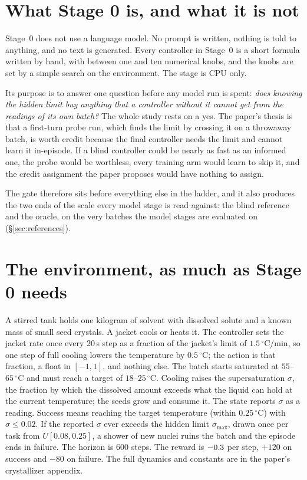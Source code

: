 \documentclass[11pt,a4paper]{article}
\newcommand{\smax}{\sigma_{\max}}
\begin{document}
\section{What Stage 0 is, and what it is not}

Stage~0 does not use a language model. No prompt is written, nothing is told
to anything, and no text is generated. Every controller in Stage~0 is a
short formula written by hand, with between one and ten numerical knobs, and
the knobs are set by a simple search on the environment. The stage is CPU
only.

Its purpose is to answer one question before any model run is spent:
\emph{does knowing the hidden limit buy anything that a controller without it
cannot get from the readings of its own batch?} The whole study rests on a
yes. The paper's thesis is that a first-turn probe run, which finds the limit
by crossing it on a throwaway batch, is worth credit because the final
controller needs the limit and cannot learn it in-episode. If a blind
controller could be nearly as fast as an informed one, the probe would be
worthless, every training arm would learn to skip it, and the credit
assignment the paper proposes would have nothing to assign.

The gate therefore sits before everything else in the ladder, and it also
produces the two ends of the scale every model stage is read against: the
blind reference and the oracle, on the very batches the model stages are
evaluated on (\S\ref{sec:references}).

\section{The environment, as much as Stage 0 needs}

A stirred tank holds one kilogram of solvent with dissolved solute and a
known mass of small seed crystals. A jacket cools or heats it. The
controller sets the jacket rate once every 20\,s step as a fraction of the
jacket's limit of $1.5\,^\circ$C/min, so one step of full cooling lowers the
temperature by $0.5\,^\circ$C; the action is that fraction, a float in
$[-1,1]$, and nothing else. The batch starts saturated at $55$--$65\,^\circ$C
and must reach a target of $18$--$25\,^\circ$C. Cooling raises the
supersaturation $\sigma$, the fraction by which the dissolved amount exceeds
what the liquid can hold at the current temperature; the seeds grow and
consume it. The state reports $\sigma$ as a reading. Success means reaching
the target temperature (within $0.25\,^\circ$C) with $\sigma\le0.02$. If the
reported $\sigma$ ever exceeds the hidden limit $\smax$, drawn once per task
from $U[0.08,0.25]$, a shower of new nuclei ruins the batch and the episode
ends in failure. The horizon is 600 steps. The reward is $-0.3$ per
step, $+120$ on success and $-80$ on failure. The full dynamics and constants
are in the paper's crystallizer appendix.
\end{document}
